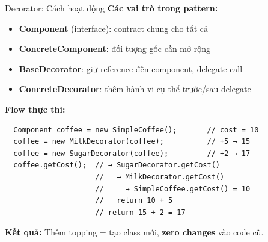 \begin{frame}[fragile]{Decorator: Cách hoạt động}
  \textbf{Các vai trò trong pattern:}
  \begin{itemize}
    \item \textcolor{myblue}{\textbf{Component}} (interface): contract chung cho tất cả
    \item \textcolor{mygreen}{\textbf{ConcreteComponent}}: đối tượng gốc cần mở rộng
    \item \textcolor{myorange}{\textbf{BaseDecorator}}: giữ reference đến component, delegate call
    \item \textcolor{mypurple}{\textbf{ConcreteDecorator}}: thêm hành vi cụ thể trước/sau delegate
  \end{itemize}

  \vspace{0.3em}
  \textbf{Flow thực thi:}
  \footnotesize
  \begin{verbatim}
  Component coffee = new SimpleCoffee();       // cost = 10
  coffee = new MilkDecorator(coffee);          // +5 → 15
  coffee = new SugarDecorator(coffee);         // +2 → 17
  coffee.getCost();  // → SugarDecorator.getCost()
                     //   → MilkDecorator.getCost()
                     //     → SimpleCoffee.getCost() = 10
                     //   return 10 + 5
                     // return 15 + 2 = 17
  \end{verbatim}

  \textcolor{mygreen}{\textbf{Kết quả:}} Thêm topping = tạo class mới, \textbf{zero changes} vào code cũ.
\end{frame}

